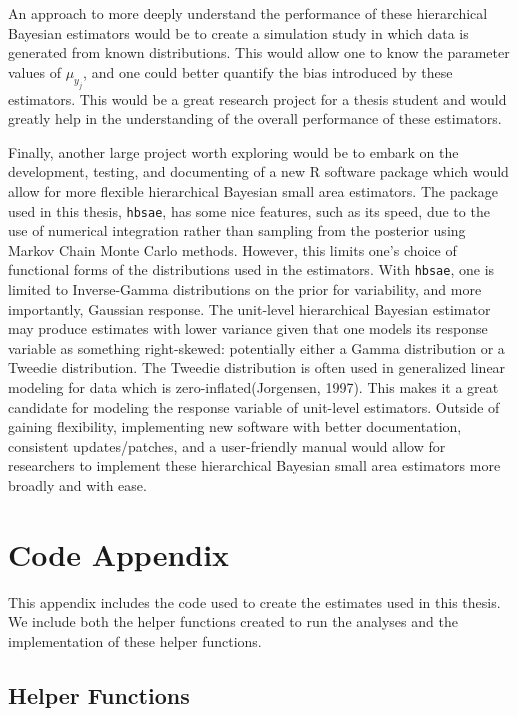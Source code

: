 \documentclass[12pt,twoside]{reedthesis}
\begin{document}
An approach to more deeply understand the performance of these hierarchical Bayesian estimators would be to create a simulation study in which data is generated from known distributions. This would allow one to know the parameter values of \(\mu_{y_j}\), and one could better quantify the bias introduced by these estimators. This would be a great research project for a thesis student and would greatly help in the understanding of the overall performance of these estimators.

Finally, another large project worth exploring would be to embark on the development, testing, and documenting of a new R software package which would allow for more flexible hierarchical Bayesian small area estimators. The package used in this thesis, \texttt{hbsae}, has some nice features, such as its speed, due to the use of numerical integration rather than sampling from the posterior using Markov Chain Monte Carlo methods. However, this limits one's choice of functional forms of the distributions used in the estimators. With \texttt{hbsae}, one is limited to Inverse-Gamma distributions on the prior for variability, and more importantly, Gaussian response. The unit-level hierarchical Bayesian estimator may produce estimates with lower variance given that one models its response variable as something right-skewed: potentially either a Gamma distribution or a Tweedie distribution. The Tweedie distribution is often used in generalized linear modeling for data which is zero-inflated(Jorgensen, 1997). This makes it a great candidate for modeling the response variable of unit-level estimators. Outside of gaining flexibility, implementing new software with better documentation, consistent updates/patches, and a user-friendly manual would allow for researchers to implement these hierarchical Bayesian small area estimators more broadly and with ease.

\appendix

\hypertarget{code-appendix}{%
\chapter{Code Appendix}\label{code-appendix}}

This appendix includes the code used to create the estimates used in this thesis. We include both the helper functions created to run the analyses and the implementation of these helper functions.

\hypertarget{helper-functions}{%
\section{Helper Functions}\label{helper-functions}}
\end{document}
